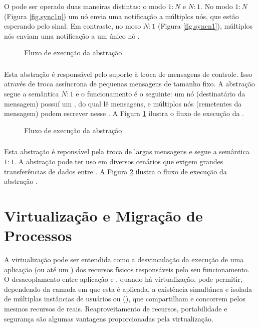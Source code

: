 O \sync pode ser operado duas maneiras distintas: o modo $1:N$ e $N:1$. No modo $1:N$ (Figura \ref{fig.sync1n}) um nó envia uma notificação a múltiplos nós, que estão esperando pelo sinal. Em contraste, no moso $N:1$ (Figura \ref{fig.syncn1}), múltiplos nós enviam uma notificação a um único nó \cite{penna:thesis}.

\begin{figure}[bt]
    \centering
    
    \caption{Fluxo de execução da abstração \mailbox \cite{penna:thesis}}\label{fig.mailbox}
\end{figure}

\subsubsection{\mailbox}
Esta abstração é responsável pelo suporte à troca de mensagens de controle. Isso através de troca assíncrona de pequenas mensagens de tamanho fixo. A abstração segue a semântica $N:1$ e o funcionamento é o seguinte: um nó (destinatário da mensagem) possuí um \mailbox, do qual lê mensagens, e múltiplos nós (remetentes da mensagem) podem escrever nesse \mailbox \cite{penna:thesis}. A Figura \ref{fig.mailbox} ilustra o fluxo de execução da \mailbox.

\begin{figure}[b]
    \centering
    
    \caption{Fluxo de execução da abstração \portal \cite{penna:thesis}}\label{fig.portal}
\end{figure}

\subsubsection{\portal}
Esta abstração é reponsável pela troca de largas mensagens e segue a semântica $1:1$. A abstração pode ter uso em diversos cenários que exigem grandes transferências de dados entre \clusters \cite{penna:thesis}. A Figura \ref{fig.portal} ilustra o fluxo de execução da abstração \portal.
    

\section{Virtualização e Migração de Processos}
\label{sec.virtualizacao}

A virtualização pode ser entendida como a desvinculação da execução de uma aplicação (ou até um \so) dos recursos físicos responsáveis pelo seu funcionamento. O desacoplamento entre aplicação e \hardware, quando há virtualização, pode permitir, dependendo da camada em que esta é aplicada, a existência simultânea e isolada de múltiplas instâncias de usuários ou \oss (\vms), que compartilham e concorrem pelos mesmos recursos de \hardware reais. Reaproveitamento de recursos, portabilidade e segurança são algumas vantagens proporcionadas pela virtualização.

